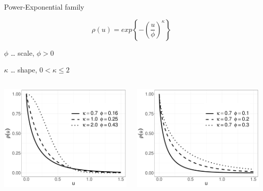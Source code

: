 \documentclass[
  ignorenonframetext,
]{beamer}
\begin{document}
\begin{frame}{Power-Exponential family}
\large

\[\rho(u)=exp\left\{-\left(\frac{u}{\phi}\right)^\kappa\right\}\]

\small

\(\phi\) \ldots{} scale, \(\phi>0\)

\(\kappa\) \ldots{} shape, \(0<\kappa\le 2\)

\begin{columns}[T]
\begin{column}{0.5\textwidth}
\includegraphics{Lecture_1_files/figure-beamer/unnamed-chunk-8-1.pdf}
\end{column}

\begin{column}{0.5\textwidth}
\includegraphics{Lecture_1_files/figure-beamer/unnamed-chunk-9-1.pdf}
\end{column}
\end{columns}
\end{frame}
\end{document}

